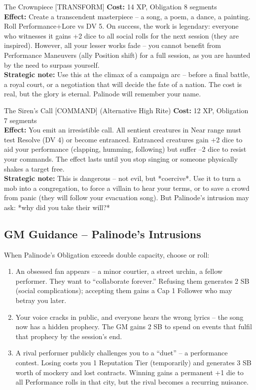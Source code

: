 \documentclass[10pt,a5paper]{book}
\begin{document}
\begin{patronbox}{The Crownpiece [TRANSFORM]}
\textbf{Cost:} 14 XP, Obligation 8 segments \\
\textbf{Effect:} Create a transcendent masterpiece – a song, a poem, a dance, a painting. Roll Performance+Lore vs DV 5. On success, the work is legendary: everyone who witnesses it gains +2 dice to all social rolls for the next session (they are inspired). However, all your lesser works fade – you cannot benefit from Performance Maneuvers (ally Position shift) for a full session, as you are haunted by the need to surpass yourself. \\
\textbf{Strategic note:} Use this at the climax of a campaign arc – before a final battle, a royal court, or a negotiation that will decide the fate of a nation. The cost is real, but the glory is eternal. Palinode will remember your name.
\end{patronbox}

\begin{patronbox}{The Siren’s Call [COMMAND] (Alternative High Rite)}
\textbf{Cost:} 12 XP, Obligation 7 segments \\
\textbf{Effect:} You emit an irresistible call. All sentient creatures in Near range must test Resolve (DV 4) or become entranced. Entranced creatures gain +2 dice to aid your performance (clapping, humming, following) but suffer –2 dice to resist your commands. The effect lasts until you stop singing or someone physically shakes a target free. \\
\textbf{Strategic note:} This is dangerous – not evil, but *coercive*. Use it to turn a mob into a congregation, to force a villain to hear your terms, or to save a crowd from panic (they will follow your evacuation song). But Palinode’s intrusion may ask: *why did you take their will?*
\end{patronbox}

\subsection*{GM Guidance – Palinode’s Intrusions}

When Palinode’s Obligation exceeds double capacity, choose or roll:
\begin{enumerate}
    \item An obsessed fan appears – a minor courtier, a street urchin, a fellow performer. They want to “collaborate forever.” Refusing them generates 2 SB (social complications); accepting them gains a Cap 1 Follower who may betray you later.
    \item Your voice cracks in public, and everyone hears the wrong lyrics – the song now has a hidden prophecy. The GM gains 2 SB to spend on events that fulfil that prophecy by the session’s end.
    \item A rival performer publicly challenges you to a “duet” – a performance contest. Losing costs you 1 Reputation Tier (temporarily) and generates 3 SB worth of mockery and lost contracts. Winning gains a permanent +1 die to all Performance rolls in that city, but the rival becomes a recurring nuisance.
\end{enumerate}
\end{document}
